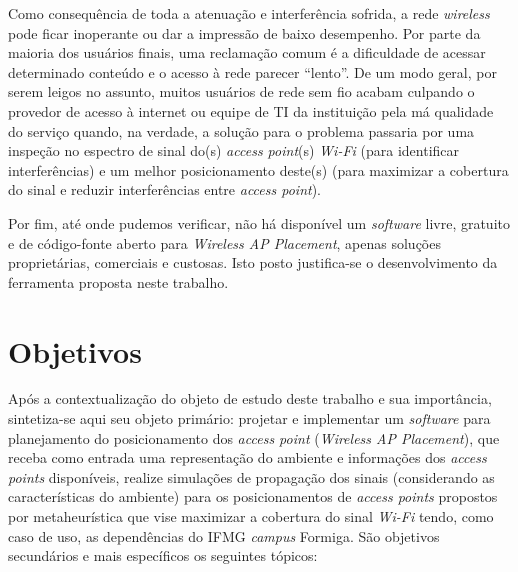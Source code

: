 \documentclass[
	12pt,				%
	twoside,			%
	a4paper,			%
	english,			%
	french,				%
	spanish,			%
	brazil				%
	]{abntex2}
\begin{document}
Como consequência de toda a atenuação e interferência sofrida, a rede
\emph{wireless} pode ficar inoperante ou dar a impressão de baixo
desempenho. Por parte da maioria dos usuários finais, uma reclamação
comum é a dificuldade de acessar determinado conteúdo e o acesso à rede
parecer ``lento''. De um modo geral, por serem leigos no assunto, muitos
usuários de rede sem fio acabam culpando o provedor de acesso à internet
ou equipe de TI da instituição pela má qualidade do serviço quando, na
verdade, a solução para o problema passaria por uma inspeção no espectro
de sinal do(s) \emph{access point}(s) \emph{Wi-Fi} (para identificar
interferências) e um melhor posicionamento deste(s) (para maximizar a
cobertura do sinal e reduzir interferências entre \emph{access point}).

Por fim, até onde pudemos verificar, não há disponível um
\emph{software} livre, gratuito e de código-fonte aberto para
\emph{Wireless AP Placement}, apenas soluções proprietárias, comerciais
e custosas. Isto posto justifica-se o desenvolvimento da ferramenta
proposta neste trabalho.

\section{Objetivos}\label{objetivos}

Após a contextualização do objeto de estudo deste trabalho e sua
importância, sintetiza-se aqui seu objeto primário: projetar e
implementar um \emph{software} para planejamento do posicionamento dos
\emph{access point} (\emph{Wireless AP Placement}), que receba como
entrada uma representação do ambiente e informações dos \emph{access
points} disponíveis, realize simulações de propagação dos sinais
(considerando as características do ambiente) para os posicionamentos de
\emph{access points} propostos por metaheurística que vise maximizar a
cobertura do sinal \emph{Wi-Fi} tendo, como caso de uso, as dependências
do IFMG \emph{campus} Formiga. São objetivos secundários e mais
específicos os seguintes tópicos:
\end{document}
